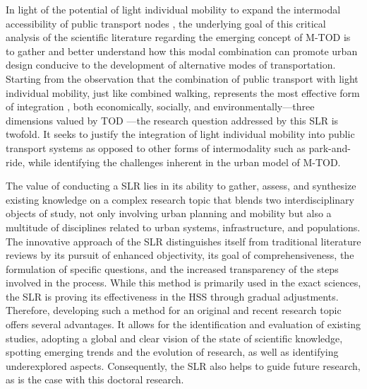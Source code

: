 \begin{refsegment}
In light of the potential of light individual mobility to expand the \gls{intermodal accessibility} of public transport nodes \textcolor{blue}{\autocite[118]{cottrell_transforming_2007}}, the underlying goal of this critical analysis of the scientific literature regarding the emerging concept of \acrfull{M-TOD} is to gather and better understand how this modal combination can promote urban design conducive to the development of alternative modes of transportation. Starting from the observation that the combination of public transport with light individual mobility, just like combined walking, represents the most effective form of integration \textcolor{blue}{\autocite[50]{sebban_complementarite_2003, yang_study_2013}}, both economically, socially, and environmentally—three dimensions valued by \acrshort{TOD} \textcolor{blue}{\autocite[85]{cervero_bike-and-ride_2013}}—the research question addressed by this \acrshort{SLR} is twofold. It seeks to justify the integration of light individual mobility into public transport systems as opposed to other forms of intermodality such as park-and-ride, while identifying the challenges inherent in the urban model of \acrshort{M-TOD}.%

The value of conducting a \acrshort{SLR} lies in its ability to gather, assess, and synthesize existing knowledge on a complex research topic that blends two interdisciplinary objects of study, not only involving urban planning and mobility but also a multitude of disciplines related to urban systems, infrastructure, and populations. The innovative approach of the \acrshort{SLR} distinguishes itself from traditional literature reviews by its pursuit of enhanced objectivity, its goal of comprehensiveness, the formulation of specific questions, and the increased transparency of the steps involved in the process. While this method is primarily used in the exact sciences, the \acrshort{SLR} is proving its effectiveness in the \acrfull{HSS} through gradual adjustments. Therefore, developing such a method for an original and recent research topic offers several advantages. It allows for the identification and evaluation of existing studies, adopting a global and clear vision of the state of scientific knowledge, spotting emerging trends and the evolution of research, as well as identifying underexplored aspects. Consequently, the \acrshort{SLR} also helps to guide future research, as is the case with this doctoral research.%


\end{refsegment}
